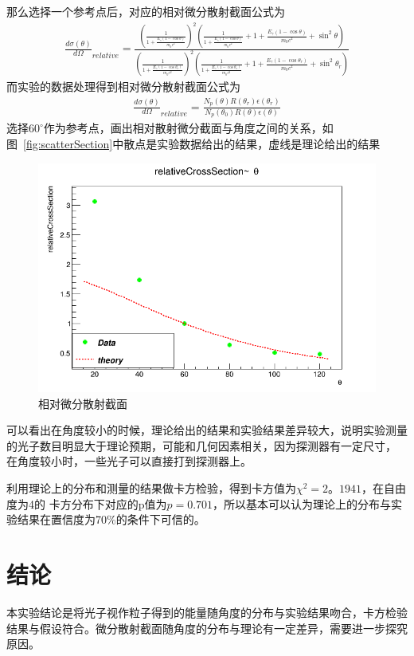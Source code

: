 \documentclass[10pt]{ctexart}
\begin{document}
那么选择一个参考点后，对应的相对微分散射截面公式为
\begin{align}
    \frac{d\sigma(\theta)}{d\Omega}_{relative}=\frac{(\frac{1}{1+\frac{E_\gamma(1-\cos{\theta})}{m_0c^2}})^2(\frac{1}{1+\frac{E_\gamma(1-\cos{\theta})}{m_0c^2}}+1+\frac{E_\gamma(1-\cos{\theta})}{m_0c^2}+\sin^2{\theta})}{(\frac{1}{1+\frac{E_\gamma(1-\cos{\theta_r})}{m_0c^2}})^2(\frac{1}{1+\frac{E_\gamma(1-\cos{\theta_r})}{m_0c^2}}+1+\frac{E_\gamma(1-\cos{\theta_r})}{m_0c^2}+\sin^2{\theta_r})}
    \label{equ:scatterSectionRelative}
\end{align}
而实验的数据处理得到相对微分散射截面公式为
\begin{align}
    \frac{d\sigma(\theta)}{d\Omega}_{relative}=\frac{N_p(\theta)R(\theta_r)\epsilon(\theta_r)}{N_p(\theta_0)R(\theta)\epsilon(\theta)}
    \label{equ:scatterSectionRelativeExp}
\end{align}
选择$60^\circ$作为参考点，画出相对散射微分截面与角度之间的关系，如图~\ref{fig:scatterSection}中散点是实验数据给出的结果，虚线是理论给出的结果
\begin{figure}[htbp]
    \centering
    \includegraphics[width=\textwidth]{data/scatterPBarn.png}
    \caption{相对微分散射截面}
    \label{fig:fit}
\end{figure}
可以看出在角度较小的时候，理论给出的结果和实验结果差异较大，说明实验测量的光子数目明显大于理论预期，可能和几何因素相关，因为探测器有一定尺寸，
在角度较小时，一些光子可以直接打到探测器上。

利用理论上的分布和测量的结果做卡方检验，得到卡方值为$\chi^2=2。1941$，在自由度为4的
卡方分布下对应的p值为$p=0.701$，所以基本可以认为理论上的分布与实验结果在置信度为70\%的条件下可信的。

\section{结论}
本实验结论是将光子视作粒子得到的能量随角度的分布与实验结果吻合，卡方检验结果与假设符合。微分散射截面随角度的分布与理论有一定差异，需要进一步探究原因。

\end{document}
